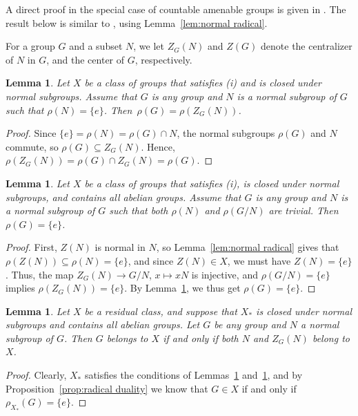 \documentclass[a4paper]{amsart}
\theoremstyle{plain}
\newtheorem{lemma}[theorem]{Lemma}
\theoremstyle{definition}
\theoremstyle{remark}
\numberwithin{theorem}{section}
\begin{document}
A direct proof in the special case of countable amenable groups is given in \cite[Corollary~B.4]{TD}.
The result below is similar to \cite[Corollary~B.6]{TD}, using Lemma~\ref{lem:normal radical}.

For a group $G$ and a subset $N$, we let $Z_G(N)$ and $Z(G)$ denote the centralizer of $N$ in $G$,
and the center of $G$, respectively.

\begin{lemma}\label{lem:centralizer1}
Let $X$ be a class of groups that satisfies (i) and is closed under normal subgroups.
Assume that $G$ is any group and $N$ is a normal subgroup of $G$ such that $\rho(N)=\{e\}$.
Then~$\rho(G)=\rho(Z_G(N))$.
\end{lemma}

\begin{proof}
Since $\{e\}=\rho(N)=\rho(G)\cap N$, the normal subgroups $\rho(G)$ and $N$ commute, so $\rho(G)\subseteq Z_G(N)$.
Hence, $\rho(Z_G(N))=\rho(G)\cap Z_G(N)=\rho(G)$.
\end{proof}

\begin{lemma}\label{lem:centralizer2}
Let $X$ be a class of groups that satisfies (i), is closed under normal subgroups, and contains all abelian groups.
Assume that $G$ is any group and $N$ is a normal subgroup of $G$ such that both $\rho(N)$ and $\rho(G/N)$ are trivial.
Then $\rho(G)=\{e\}$.
\end{lemma}

\begin{proof}
First, $Z(N)$ is normal in $N$, so Lemma~\ref{lem:normal radical} gives that $\rho(Z(N))\subseteq\rho(N)=\{e\}$,
and since $Z(N)\in X$, we must have $Z(N)=\{e\}$.
Thus, the map $Z_G(N)\to G/N$, $x\mapsto xN$ is injective, and $\rho(G/N)=\{e\}$ implies $\rho(Z_G(N))=\{e\}$.
By Lemma~\ref{lem:centralizer1}, we thus get $\rho(G)=\{e\}$.
\end{proof}

\begin{lemma}
Let $X$ be a residual class, and suppose that $X_*$ is closed under normal subgroups and contains all abelian groups.
Let $G$ be any group and $N$ a normal subgroup of $G$.
Then $G$ belongs to $X$ if and only if both $N$ and $Z_G(N)$ belong to $X$.
\end{lemma}

\begin{proof}
Clearly, $X_*$ satisfies the conditions of Lemmas~\ref{lem:centralizer1} and~\ref{lem:centralizer2},
and by Proposition~\ref{prop:radical duality} we know that $G\in X$ if and only if $\rho_{X_*}(G)=\{e\}$.
\end{proof}
\end{document}
